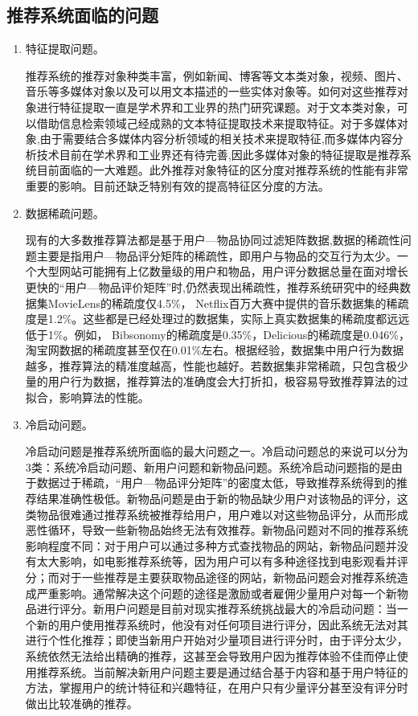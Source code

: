 	\subsection{推荐系统面临的问题}
	\begin{enumerate}[(1)]
	\item 特征提取问题。

	推荐系统的推荐对象种类丰富，例如新闻、博客等文本类对象，视频、图片、音乐等多媒体对象以及可以用文本描述的一些实体对象等。如何对这些推荐对象进行特征提取一直是学术界和工业界的热门研究课题。对于文本类对象，可以借助信息检索领域己经成熟的文本特征提取技术来提取特征。对于多媒体对象,由于需要结合多媒体内容分析领域的相关技术来提取特征,而多媒体内容分析技术目前在学术界和工业界还有待完善,因此多媒体对象的特征提取是推荐系统目前面临的一大难题。此外推荐对象特征的区分度对推荐系统的性能有非常重要的影响。目前还缺乏特别有效的提高特征区分度的方法。
	\item 数据稀疏问题。

	现有的大多数推荐算法都是基于用户—物品协同过滤矩阵数据,数据的稀疏性问题主要是指用户—物品评分矩阵的稀疏性，即用户与物品的交互行为太少。一个大型网站可能拥有上亿数量级的用户和物品，用户评分数据总量在面对增长更快的“用户—物品评价矩阵”时,仍然表现出稀疏性，推荐系统研究中的经典数据集MovieLens的稀疏度仅4.5\%， Netflix百万大赛中提供的音乐数据集的稀疏度是1.2\%。这些都是已经处理过的数据集，实际上真实数据集的稀疏度都远远低于1\%。例如， Bibsonomy的稀疏度是0.35\%，Delicious的稀疏度是0.046\%，淘宝网数据的稀疏度甚至仅在0.01\%左右。根据经验，数据集中用户行为数据越多，推荐算法的精准度越高，性能也越好。若数据集非常稀疏，只包含极少量的用户行为数据，推荐算法的准确度会大打折扣，极容易导致推荐算法的过拟合，影响算法的性能。
	\item 冷启动问题。

	冷启动问题是推荐系统所面临的最大问题之一。冷启动问题总的来说可以分为3类：系统冷启动问题、新用户问题和新物品问题。系统冷启动问题指的是由于数据过于稀疏，“用户—物品评分矩阵”的密度太低，导致推荐系统得到的推荐结果准确性极低。新物品问题是由于新的物品缺少用户对该物品的评分，这类物品很难通过推荐系统被推荐给用户，用户难以对这些物品评分，从而形成恶性循环，导致一些新物品始终无法有效推荐。新物品问题对不同的推荐系统影响程度不同：对于用户可以通过多种方式查找物品的网站，新物品问题并没有太大影响，如电影推荐系统等，因为用户可以有多种途径找到电影观看并评分；而对于一些推荐是主要获取物品途径的网站，新物品问题会对推荐系统造成严重影响。通常解决这个问题的途径是激励或者雇佣少量用户对每一个新物品进行评分。新用户问题是目前对现实推荐系统挑战最大的冷启动问题：当一个新的用户使用推荐系统时，他没有对任何项目进行评分，因此系统无法对其进行个性化推荐；即使当新用户开始对少量项目进行评分时，由于评分太少，系统依然无法给出精确的推荐，这甚至会导致用户因为推荐体验不佳而停止使用推荐系统。当前解决新用户问题主要是通过结合基于内容和基于用户特征的方法，掌握用户的统计特征和兴趣特征，在用户只有少量评分甚至没有评分时做出比较准确的推荐。


\end{enumerate}
